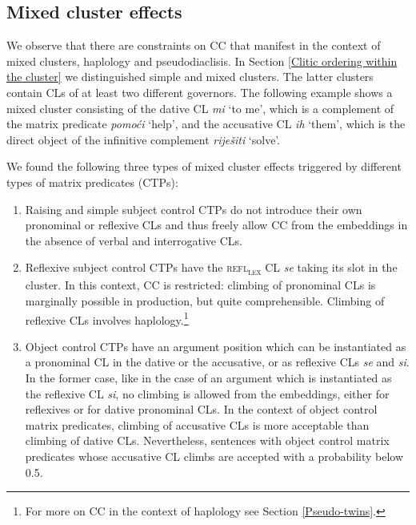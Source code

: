 \subsection{Mixed cluster effects}
\label{Mixed cluster effects}
We observe that there are constraints on CC that manifest in the context of mixed clusters, haplology and pseudodiaclisis. In Section \ref{Clitic ordering within the cluster} we distinguished simple and mixed clusters. The latter clusters contain CLs of at least two different governors. The following example shows a mixed cluster consisting of the dative CL \textit{mi} ‘to me’, which is a complement of the matrix predicate \textit{pomoći} ‘help’, and the accusative CL \textit{ih} ‘them’, which is the direct object of the infinitive complement \textit{riješiti} ‘solve’.


\noindent We found the following three types of mixed cluster effects triggered by different types of matrix predicates (CTPs): 

\begin{enumerate}\sloppy
\item Raising and simple subject control CTPs do not introduce their own pronominal or reflexive CLs and thus freely allow CC from the embeddings in the absence of verbal and interrogative CLs. 
\item Reflexive subject control CTPs have the \textsc{refl\textsubscript{lex}} CL \textit{se} taking its slot in the cluster. In this context, CC is restricted: climbing of pronominal CLs is marginally possible in production, but quite comprehensible. Climbing of reflexive CLs involves haplology.\footnote{For more on CC in the context of haplology see Section \ref{Pseudo-twins}.}
\item Object control CTPs have an argument position which can be instantiated as a pronominal CL in the dative or the accusative, or as reflexive CLs \textit{se} and \textit{si}. In the former case, like in the case of an argument which is instantiated as the reflexive CL \textit{si}, no climbing is allowed from the embeddings, either for reflexives or for dative pronominal CLs. In the context of object control matrix predicates, climbing of accusative CLs is more acceptable than climbing of dative CLs. Nevertheless, sentences with object control matrix predicates whose accusative CL climbs are accepted with a probability below 0.5.
\end{enumerate}

